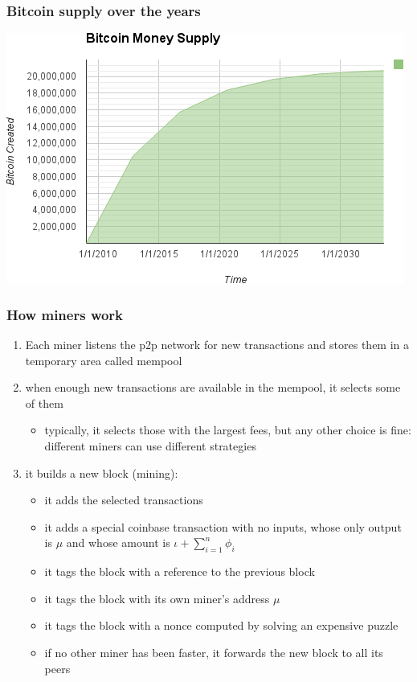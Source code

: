 \documentclass[11pt]{beamer}  %
\begin{document}
\begin{frame}\frametitle{Bitcoin supply over the years}

  \begin{center}
    \includegraphics[width=\textwidth,clip=false]{pictures/mbc2_1001.png}
  \end{center}

\end{frame}

\begin{frame}\frametitle{How miners work}

  \begin{enumerate}
    \item Each miner listens the p2p network for new transactions and stores them in a
      temporary area called mempool
    \item when enough new transactions are available in the mempool, it selects some of them
      \begin{itemize}
      \item typically, it selects those with the largest fees, but any other choice is fine: different miners can use different strategies
      \end{itemize}
    \item it builds a new block (\alert{mining}):
      \begin{itemize}
      \item it adds the selected transactions
      \item it adds a special \alert{coinbase transaction} with no inputs, whose only output is $\mu$
        and whose amount is $\iota+\sum_{i=1}^n\phi_i$
      \item it tags the block with a reference to the previous block
      \item it tags the block with its own miner's address $\mu$
      \item it tags the block with a nonce computed by solving an expensive puzzle
      \item if no other miner has been faster, it forwards the new block to all its peers
      \end{itemize}
  \end{enumerate}
\end{frame}
\end{document}
